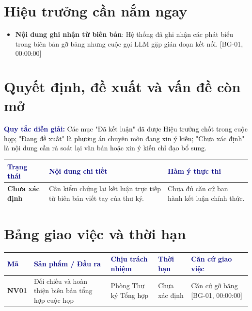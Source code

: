 \documentclass[11pt,a4paper]{article}
\newcommand{\source}[1]{\textcolor{muted}{\footnotesize\textsf{[#1]}}}
\newcommand{\notice}[2]{%
  \vspace{4pt}%
  \noindent\colorbox{light}{%
    \parbox{\dimexpr\textwidth-2\fboxsep\relax}{%
      \vspace{2pt}%
      \small\textbf{\textcolor{navy}{#1:}} \textcolor{black}{#2}%
      \vspace{2pt}%
    }%
  }%
  \vspace{4pt}%
}
\begin{document}
\section{Hiệu trưởng cần nắm ngay}

\begin{itemize}[leftmargin=1.5em, itemsep=3pt]
  \item \textbf{Nội dung ghi nhận từ biên bản}: Hệ thống đã ghi nhận các phát biểu trong biên bản gỡ băng nhưng cuộc gọi LLM gặp gián đoạn kết nối. \source{BG-01, 00:00:00}
\end{itemize}

\section{Quyết định, đề xuất và vấn đề còn mở}

\notice{Quy tắc diễn giải}{Các mục "Đã kết luận" đã được Hiệu trưởng chốt trong cuộc họp; "Đang đề xuất" là phương án chuyên môn đang xin ý kiến; "Chưa xác định" là nội dung cần rà soát lại văn bản hoặc xin ý kiến chỉ đạo bổ sung.}

\vspace{3pt}
\begin{tabularx}{\textwidth}{@{}>{\raggedright\arraybackslash\bfseries}p{2.8cm} >{\raggedright\arraybackslash}X >{\raggedright\arraybackslash}p{4.5cm}@{}}
  \toprule
  \rowcolor{light}
  \textcolor{navy}{Trạng thái} & \textcolor{navy}{Nội dung chi tiết} & \textcolor{navy}{Hàm ý thực thi} \\
  \midrule
  \textbf{Chưa xác định} & Cần kiểm chứng lại kết luận trực tiếp từ biên bản viết tay của thư ký. & Chưa đủ căn cứ ban hành kết luận chính thức. \\
  \midrule
  \bottomrule
\end{tabularx}

\section{Bảng giao việc và thời hạn}

\begin{tabularx}{\textwidth}{@{}>{\bfseries\centering\arraybackslash}p{1.3cm} >{\raggedright\arraybackslash}X >{\raggedright\arraybackslash}p{3.2cm} >{\centering\arraybackslash}p{2.2cm} >{\raggedright\arraybackslash}p{3.2cm}@{}}
  \toprule
  \rowcolor{light}
  \textcolor{navy}{Mã} & \textcolor{navy}{Sản phẩm / Đầu ra} & \textcolor{navy}{Chịu trách nhiệm} & \textcolor{navy}{Thời hạn} & \textcolor{navy}{Căn cứ giao việc} \\
  \midrule
  NV01 & Đối chiếu và hoàn thiện biên bản tổng hợp cuộc họp & Phòng Thư ký Tổng hợp & Chưa xác định & \small Căn cứ gỡ băng [BG-01, 00:00:00] \\
  \midrule
  \bottomrule
\end{tabularx}
\end{document}
